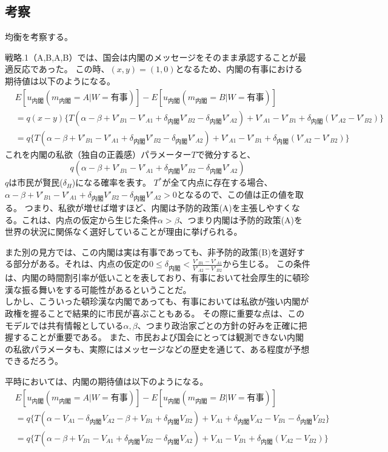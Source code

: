 \documentclass[main.tex]{subfiles}
\begin{document}
\subsection{考察}
均衡を考察する。

戦略.1（A,B,A,B）では、国会は内閣のメッセージをそのまま承認することが最適反応であった。
この時、$(x, y) = (1,0)$となるため、内閣の有事における期待値は以下のようになる。
\begin{align*}
    &E[u_{内閣}(m_{内閣}=A|W=有事)] - E[u_{内閣}(m_{内閣}=B|W=有事)] \\
    &= q(x-y) \lbrace T(\alpha-\beta + V'_{B1}-V'_{A1} + \delta_{内閣}V'_{B2} - \delta_{内閣}V'_{A2}) + V'_{A1} - V'_{B1} + \delta_{内閣}(V'_{A2} - V'_{B2})  \rbrace\\
    &= q \lbrace T(\alpha-\beta + V'_{B1}-V'_{A1} + \delta_{内閣}V'_{B2} - \delta_{内閣}V'_{A2}) + V'_{A1} - V'_{B1} + \delta_{内閣}(V'_{A2} - V'_{B2})  \rbrace 
\end{align*}
これを内閣の私欲（独自の正義感）パラメーター$T$で微分すると、
$$ q(\alpha-\beta + V'_{B1}-V'_{A1} + \delta_{内閣}V'_{B2} - \delta_{内閣}V'_{A2}) $$
$q$は市民が賢民($\delta_H$)になる確率を表す。
$T^*$が全て内点に存在する場合、$\alpha-\beta + V'_{B1}-V'_{A1} + \delta_{内閣}V'_{B2} - \delta_{内閣}V'_{A2}>0$となるので、この値は正の値を取る。
つまり、私欲が増せば増すほど、内閣は予防的政策(A)を主張しやすくなる。これは、内点の仮定から生じた条件$\alpha>\beta$、つまり内閣は予防的政策(A)を世界の状況に関係なく選好していることが理由に挙げられる。

また別の見方では、この内閣は実は有事であっても、非予防的政策(B)を選好する部分がある。それは、内点の仮定の$0\le \delta_{内閣} < \frac{V'_{B1} - V'_{A1}}{V'_{A2} - V'_{B2}}$から生じる。
この条件は、内閣の時間割引率が低いことを表しており、有事において社会厚生的に頓珍漢な振る舞いをする可能性があるということだ。\\
しかし、こういった頓珍漢な内閣であっても、有事においては私欲が強い内閣が政権を握ることで結果的に市民が喜ぶこともある。
その際に重要な点は、このモデルでは共有情報としている$\alpha, \beta$、つまり政治家ごとの方針の好みを正確に把握することが重要である。
また、市民および国会にとっては観測できない内閣の私欲パラメータも、実際にはメッセージなどの歴史を通じて、ある程度が予想できるだろう。


平時においては、内閣の期待値は以下のようになる。
\begin{align*}
    &E[u_{内閣}(m_{内閣}=A|W=有事)] - E[u_{内閣}(m_{内閣}=B|W=有事)] \\
    &= q\lbrace T(\alpha -V_{A1} -\delta_{内閣}V_{A2} - \beta + V_{B1} + \delta_{内閣}V_{B2}) + V_{A1} + \delta_{内閣}V_{A2} - V_{B1} - \delta_{内閣}V_{B2}  \rbrace\\
    &= q\lbrace T(\alpha - \beta + V_{B1}-V_{A1} + \delta_{内閣}V_{B2} -\delta_{内閣}V_{A2}   ) + V_{A1} - V_{B1} + \delta_{内閣}(V_{A2}  - V_{B2})  \rbrace
\end{align*}
\end{document}
